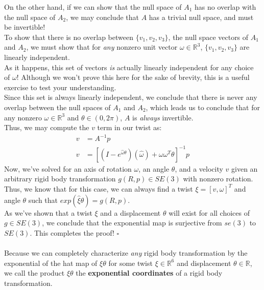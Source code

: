 \documentclass[oneside]{book}
\begin{document}
On the other hand, if we can show that the null space of $A_1$ has no overlap with the null space of $A_2$, we may conclude that $A$ has a trivial null space, and must be invertible!\\
To show that there is no overlap between $\{v_1, v_2, v_3\}$, the null space vectors of $A_1$ and $A_2$, we must show that for \textit{any} nonzero unit vector $\omega \in \mathbb{R}^3$, $\{v_1, v_2, v_3\}$ are linearly independent.\\
As it happens, this set of vectors \textit{is} actually linearly independent for any choice of $\omega$! Although we won't prove this here for the sake of brevity, this is a useful exercise to test your understanding.\\
Since this set is always linearly independent, we conclude that there is never any overlap between the null spaces of $A_1$ and $A_2$, which leads us to conclude that for any  nonzero $\omega \in \mathbb{R}^3$ and $\theta \in (0, 2\pi)$, $A$ is \textit{always} invertible.\\
Thus, we may compute the $v$ term in our twist as:
\begin{align}
    v &= A^{-1}p\\
    v &= [(I - e^{\hat\omega\theta})( \hat\omega) + \omega\omega^T\theta]^{-1}p
\end{align}
Now, we've solved for an axis of rotation $\omega$, an angle $\theta$, and a velocity $v$ given an arbitrary rigid body transformation $g(R, p) \in SE(3)$ with nonzero rotation. Thus, we know that for this case, we can always find a twist $\xi = [v, \omega]^T$ and angle $\theta$ such that $exp(\hat\xi\theta) = g(R, p)$.\\
As we've shown that a twist $\xi$ and a displacement $\theta$ will exist for all choices of $g \in SE(3)$, we conclude that the exponential map is surjective from $se(3)$ to $SE(3)$. This completes the proof! $\square$\\\\
Because we can completely characterize \textit{any} rigid body transformation by the exponential of the hat map of $\xi\theta$ for some twist $\xi\in \mathbb{R}^6$ and displacement $\theta\in \mathbb{R}$, we call the product $\xi\theta$ the \textbf{exponential coordinates} of a rigid body transformation.
\end{document}
